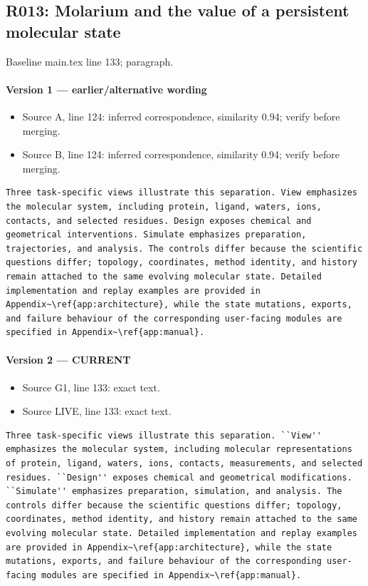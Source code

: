 \documentclass[11pt]{article}
\begin{document}
\subsection{R013: Molarium and the value of a persistent molecular state}

Baseline main.tex line 133; paragraph.

\paragraph{Version 1 --- earlier/alternative wording}

\begin{itemize}[leftmargin=*]
\item Source A, line 124: inferred correspondence, similarity 0.94; verify before merging.
\item Source B, line 124: inferred correspondence, similarity 0.94; verify before merging.
\end{itemize}

\begin{lstlisting}
Three task-specific views illustrate this separation. View emphasizes the molecular system, including protein, ligand, waters, ions, contacts, and selected residues. Design exposes chemical and geometrical interventions. Simulate emphasizes preparation, trajectories, and analysis. The controls differ because the scientific questions differ; topology, coordinates, method identity, and history remain attached to the same evolving molecular state. Detailed implementation and replay examples are provided in Appendix~\ref{app:architecture}, while the state mutations, exports, and failure behaviour of the corresponding user-facing modules are specified in Appendix~\ref{app:manual}.
\end{lstlisting}

\paragraph{Version 2 --- CURRENT}

\begin{itemize}[leftmargin=*]
\item Source G1, line 133: exact text.
\item Source LIVE, line 133: exact text.
\end{itemize}

\begin{lstlisting}
Three task-specific views illustrate this separation. ``View'' emphasizes the molecular system, including molecular representations of protein, ligand, waters, ions, contacts, measurements, and selected residues. ``Design'' exposes chemical and geometrical modifications. ``Simulate'' emphasizes preparation, simulation, and analysis. The controls differ because the scientific questions differ; topology, coordinates, method identity, and history remain attached to the same evolving molecular state. Detailed implementation and replay examples are provided in Appendix~\ref{app:architecture}, while the state mutations, exports, and failure behaviour of the corresponding user-facing modules are specified in Appendix~\ref{app:manual}.
\end{lstlisting}
\end{document}
